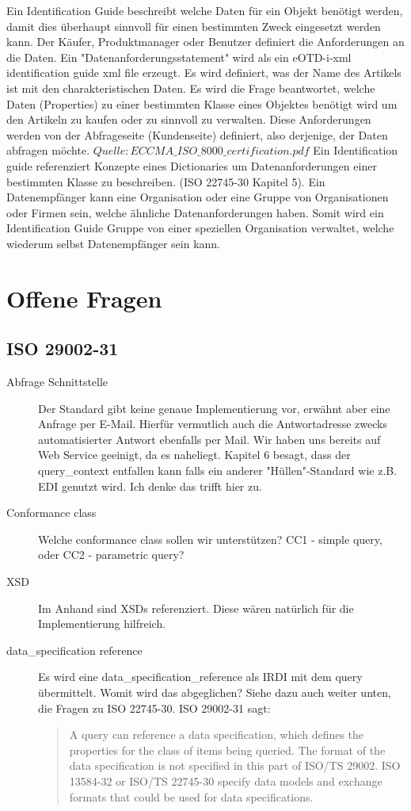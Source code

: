 Ein Identification Guide beschreibt welche Daten für ein Objekt benötigt werden, damit dies überhaupt sinnvoll für einen bestimmten Zweck eingesetzt werden kann. Der Käufer, Produktmanager oder Benutzer definiert die Anforderungen an die Daten. Ein "Datenanforderungsstatement" wird als ein eOTD-i-xml identification guide xml file erzeugt. Es wird definiert, was der Name des Artikels ist mit den charakteristischen Daten. Es wird die Frage beantwortet, welche Daten (Properties) zu einer bestimmten Klasse eines Objektes benötigt wird um den Artikeln zu kaufen oder zu sinnvoll zu verwalten. Diese Anforderungen werden von der Abfrageseite (Kundenseite) definiert, also derjenige, der Daten abfragen möchte. \(Quelle: ECCMA\_ISO\_8000\_certification.pdf\)
Ein Identification guide referenziert Konzepte eines Dictionaries um Datenanforderungen einer bestimmten Klasse zu beschreiben. (ISO 22745-30 Kapitel 5). 
Ein Datenempfänger kann eine Organisation oder eine Gruppe von Organisationen oder Firmen sein, welche ähnliche Datenanforderungen haben. Somit wird ein Identification Guide Gruppe von einer speziellen Organisation verwaltet, welche wiederum selbst Datenempfänger sein kann.  

\section{Offene Fragen}

\subsection{ISO 29002-31}
\begin{description}
\item[Abfrage Schnittstelle] Der Standard gibt keine genaue Implementierung vor, erwähnt aber eine Anfrage per E-Mail. Hierfür vermutlich auch die Antwortadresse zwecks automatisierter Antwort ebenfalls per Mail. Wir haben uns bereits auf Web Service geeinigt, da es naheliegt. Kapitel 6 besagt, dass der query\_context entfallen kann falls ein anderer "Hüllen"-Standard wie z.B. EDI genutzt wird. Ich denke das trifft hier zu. 
\item[Conformance class] Welche conformance class sollen wir unterstützen? CC1 - simple query, oder CC2 - parametric query?
\item[XSD] Im Anhand sind XSDs referenziert. Diese wären natürlich für die Implementierung hilfreich.
\item[data\_specification reference] Es wird eine data\_specification\_reference als IRDI mit dem query übermittelt. Womit wird das abgeglichen? Siehe dazu auch weiter unten, die Fragen zu ISO 22745-30.
ISO 29002-31 sagt: 
\begin{quotation}
A query can reference a data specification, which defines the properties for the class of items being queried. The format of the data specification is not specified in this part of ISO/TS 29002. ISO 13584-32 or ISO/TS 22745-30 specify data models and exchange formats that could be used for data specifications.
\end{quotation}
\end{description}


